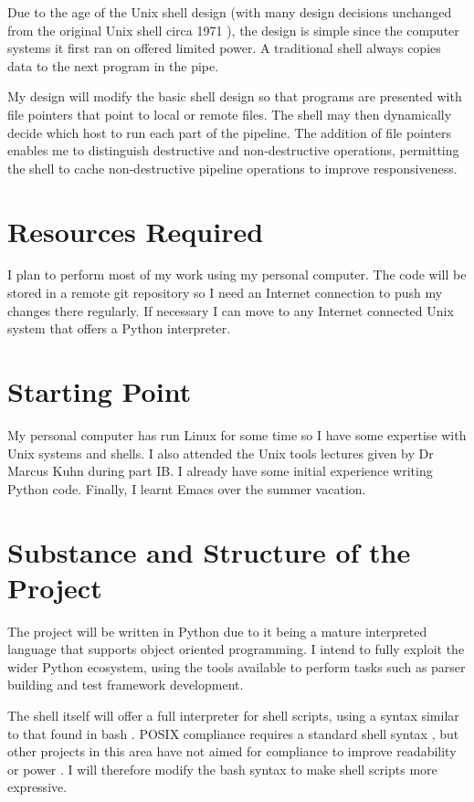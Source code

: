 \documentclass[12pt]{article}
\begin{document}
Due to the age of the Unix shell design (with many design decisions
unchanged from the original Unix shell circa 1971 \cite{firstshell}),
the design is simple since the computer systems it first ran on
offered limited power. A traditional shell always copies data to the
next program in the pipe.

My design will modify the basic shell design so that programs are
presented with file pointers that point to local or remote files. The
shell may then dynamically decide which host to run each part of the
pipeline. The addition of file pointers enables me to distinguish
destructive and non-destructive operations, permitting the shell to
cache non-destructive pipeline operations to improve responsiveness.

\section*{Resources Required}
I plan to perform most of my work using my personal computer. The code
will be stored in a remote git repository so I need an Internet
connection to push my changes there regularly. If necessary I can move
to any Internet connected Unix system that offers a Python interpreter.

\section*{Starting Point}
My personal computer has run Linux for some time so I have some
expertise with Unix systems and shells. I also attended the Unix tools
lectures given by Dr Marcus Kuhn during part IB. I already have some
initial experience writing Python code. Finally, I learnt Emacs over
the summer vacation.

\section*{Substance and Structure of the Project}
The project will be written in Python due to it being a mature
interpreted language that supports object oriented programming. I
intend to fully exploit the wider Python ecosystem, using the tools
available to perform tasks such as parser building and test framework
development.

The shell itself will offer a full interpreter for shell scripts,
using a syntax similar to that found in bash \cite{bash}. POSIX
compliance requires a standard shell syntax \cite{posix}, but other
projects in this area have not aimed for compliance to improve
readability \cite{fish} or power \cite{powershell}. I will therefore
modify the bash syntax to make shell scripts more expressive.
\end{document}
